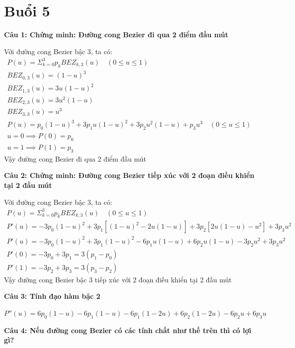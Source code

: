 \section{Buổi 5}

\textbf{Câu 1: Chứng minh: Đường cong Bezier đi qua 2 điểm đầu mút}

Với đường cong Bezier bậc 3, ta có:
\begin{gather*}
	P(u) = \Sigma_{k=0}^{3} p_k BEZ_{k, 3}(u) \quad (0 \le u \le 1)\\
	BEZ_{0, 3}(u) = (1-u)^3\\
	BEZ_{1, 3}(u) = 3u(1-u)^2\\
	BEZ_{2, 3}(u) = 3u^2(1-u)\\
	BEZ_{3, 3}(u) = u^3\\
	P(u) = p_0 (1-u)^3 + 3p_1 u(1-u)^2 + 3p_2 u^2(1-u) + p_3 u^3 \quad (0 \le u \le 1)\\
	u = 0 \implies P(0) = p_0\\
	u = 1 \implies P(1) = p_3
\end{gather*}
Vậy đường cong Bezier đi qua 2 điểm đầu mút

\textbf{Câu 2: Chứng minh: Đường cong Bezier tiếp xúc với 2 đoạn điều khiển tại 2 đầu mút}

Với đường cong Bezier bậc 3, ta có:
\begin{gather*}
	P(u) = \Sigma_{k=0}^{3} p_k BEZ_{k, 3}(u) \quad (0 \le u \le 1)\\
	P'(u) = -3p_0 (1-u)^2 + 3p_1 [(1-u)^2 -2u(1-u)] + 3p_2[2u(1-u) - u^2] + 3p_3u^2\\
	P'(u) = -3p_0 (1-u)^2 + 3p_1 (1-u)^2 - 6p_1u(1-u) + 6p_2u(1-u) - 3p_2u^2 + 3p_3u^2\\
	P'(0) = -3p_0 + 3p_1 = 3(p_1 - p_0)\\
	P'(1) = -3p_2 + 3p_3 = 3(p_3 - p_2)
\end{gather*}
Vậy đường cong Bezier bậc 3 tiếp xúc với 2 đoạn điều khiển tại 2 đầu mút

\textbf{Câu 3: Tính đạo hàm bậc 2}

$P''(u) = 6p_0 (1-u) - 6p_1 (1-u) -6p_1 (1-2u) + 6p_2 (1-2u) - 6p_2u + 6p_3u$

\textbf{Câu 4: Nếu đường cong Bezier có các tính chất như thế trên thì có lợi gì?}

